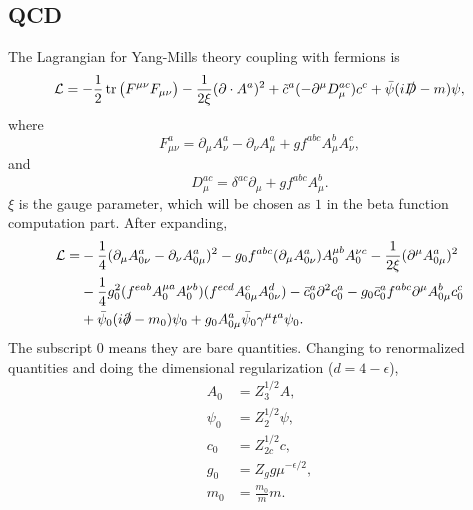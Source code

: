 \documentclass[a4paper,12pt]{article}
\begin{document}
\subsection{QCD}
The Lagrangian for Yang-Mills theory coupling with fermions is
\begin{equation}
    \mathcal{L}=-\frac{1}{2}\tr\big(F^{\mu \nu}F_{\mu \nu}\big)-\frac{1}{2\xi}(\partial\cdot A^a)^2+\tilde{c}^a(-\partial^\mu D_{\mu}^{ac})c^c+\bar{\psi}(i\slashed{D}-m)\psi,
\end{equation}
where
\begin{equation}
    F_{\mu \nu}^a=\partial_\mu A^a_\nu-\partial_\nu A^a_{\mu}+gf^{abc}A_\mu^b A_\nu^c,
\end{equation}
and
\begin{equation}
    D_{\mu}^{ac}=\delta^{ac}\partial_{\mu}+gf^{abc}A^{b}_{\mu}.
\end{equation}
$\xi$ is the gauge parameter, which will be chosen as $1$ in the beta function computation part. After expanding,
\begin{equation}
    \begin{split}
    \mathcal{L}=&-\frac{1}{4}(\partial_{\mu}A_{0\nu}^{a}-\partial_{\nu}A_{0\mu}^{a})^{2}-g_{0}f^{abc}(\partial_{\mu}A_{0\nu}^{a})A_{0}^{\mu b}A_{0}^{\nu c}-\frac{1}{2\xi}(\partial^\mu A^a_{0\mu})^2\\
    &-\frac{1}{4}g_0^{2}(f^{eab}A_{0}^{\mu a}A_{0}^{\nu b})(f^{ecd}A_{0\mu}^{c}A_{0\nu}^{d})-\bar{c}_{0}^{a}\partial^{2}c_{0}^{a}-g_0\bar{c}_{0}^{a}f^{abc}\partial^{\mu}A_{0\mu}^{b}c_{0}^{c}\\
    &+\bar{\psi}_0(i\slashed{\partial}-m_0)\psi_0+g_0 A_{0\mu}^a \bar{\psi}_0 \gamma^\mu t^a \psi_0.
    \end{split}
\end{equation}
The subscript $0$ means they are bare quantities. Changing to renormalized quantities and doing the dimensional regularization ($d=4-\epsilon$),
\begin{equation}
    \begin{split}
    A_0&=Z_3^{1/2}A,\\
    \psi_0&=Z_2^{1/2}\psi,\\
    c_0&=Z_{2c}^{1/2}c,\\
    g_0&=Z_g g \mu^{-\epsilon/2},\\
    m_0&=\frac{m_0}{m}m.
    \end{split}
\end{equation}
\end{document}

